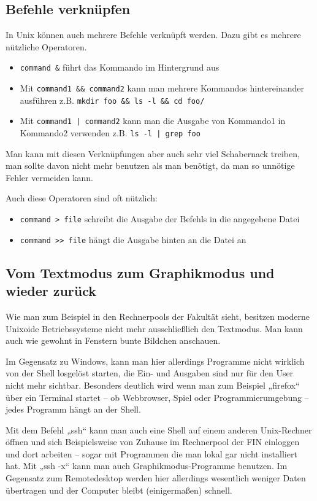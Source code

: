 \subsection{Befehle verknüpfen}
In Unix können auch mehrere Befehle verknüpft werden. Dazu gibt es mehrere nützliche Operatoren.
\begin{itemize}
\item \lstinline$command &$ führt das Kommando im Hintergrund aus
\item Mit \lstinline$command1 && command2$ kann man mehrere Kommandos hintereinander ausführen z.B. \lstinline$mkdir foo && ls -l && cd foo/$
\item Mit \lstinline$command1 | command2$ kann man die Ausgabe von Kommando1 in Kommando2 verwenden  z.B. \lstinline$ls -l | grep foo$
\end{itemize}

Man kann mit diesen Verknüpfungen aber auch sehr viel Schabernack treiben, man sollte davon nicht mehr benutzen als man benötigt, da man so unnötige Fehler vermeiden kann.

Auch diese Operatoren sind oft nützlich:
\begin{itemize}
\item \lstinline$command > file$ schreibt die Ausgabe der Befehls in die angegebene Datei
\item \lstinline$command >> file$ hängt die Ausgabe hinten an die Datei an
\end{itemize}

\subsection{Vom Textmodus zum Graphikmodus und wieder zurück}
Wie man zum Beispiel in den Rechnerpools der Fakultät sieht, besitzen moderne Unixoide Betriebssysteme nicht mehr ausschließlich den Textmodus. Man kann auch wie gewohnt in Fenstern bunte Bildchen anschauen.

Im Gegensatz zu Windows, kann man hier allerdings Programme nicht wirklich von der Shell losgelöst starten, die Ein- und Ausgaben sind nur für den User nicht mehr sichtbar. Besonders deutlich wird wenn man zum Beispiel „firefox“ über ein Terminal startet – ob Webbrowser, Spiel oder Programmierumgebung – jedes Programm hängt an der Shell.

Mit dem Befehl „ssh“ kann man auch eine Shell auf einem anderen Unix-Rechner öffnen und sich Beispielsweise von Zuhause im Rechnerpool der FIN einloggen und dort arbeiten – sogar mit Programmen die man lokal gar nicht installiert hat. Mit „ssh -x“ kann man auch Graphikmodus-Programme benutzen.
Im Gegensatz zum Remotedesktop werden hier allerdings wesentlich weniger Daten übertragen und der Computer bleibt (einigermaßen) schnell.


